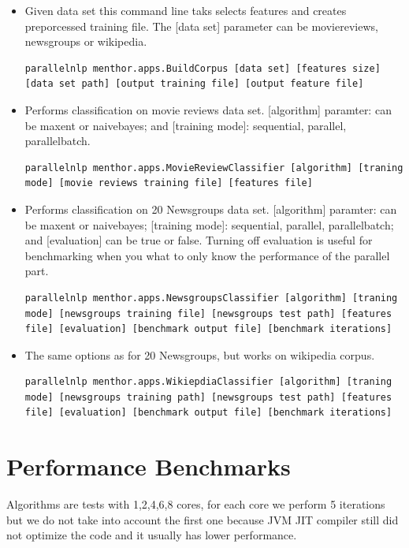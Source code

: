 \documentclass{report}
\begin{document}
\begin{itemize}

\item Given data set this command line taks selects features and creates preporcessed training file. The [data set] parameter can be moviereviews, newsgroups or wikipedia. 
\begin{lstlisting}
parallelnlp menthor.apps.BuildCorpus [data set] [features size] [data set path] [output training file] [output feature file]
\end{lstlisting}

\item Performs classification on movie reviews data set. [algorithm] paramter: can be maxent or naivebayes; and [training mode]: sequential, parallel, parallelbatch.
\begin{lstlisting}
parallelnlp menthor.apps.MovieReviewClassifier [algorithm] [traning mode] [movie reviews training file] [features file]
\end{lstlisting}

\item Performs classification on 20 Newsgroups data set. [algorithm] paramter: can be maxent or naivebayes;  [training mode]: sequential, parallel, parallelbatch; and [evaluation] can be true or false. Turning off evaluation is useful for benchmarking when you what to only know the performance of the parallel part.
\begin{lstlisting}
parallelnlp menthor.apps.NewsgroupsClassifier [algorithm] [traning mode] [newsgroups training file] [newsgroups test path] [features file] [evaluation] [benchmark output file] [benchmark iterations]
\end{lstlisting}

\item The same options as for 20 Newsgroups, but works on wikipedia corpus.
\begin{lstlisting}
parallelnlp menthor.apps.WikiepdiaClassifier [algorithm] [traning mode] [newsgroups training path] [newsgroups test path] [features file] [evaluation] [benchmark output file] [benchmark iterations]
\end{lstlisting}

\end{itemize}

\section{Performance Benchmarks}

Algorithms are tests with 1,2,4,6,8 cores, for each core we perform 5 iterations but we do not take into account the first one because JVM JIT compiler still did not optimize the code and it usually has lower performance.
\end{document}
